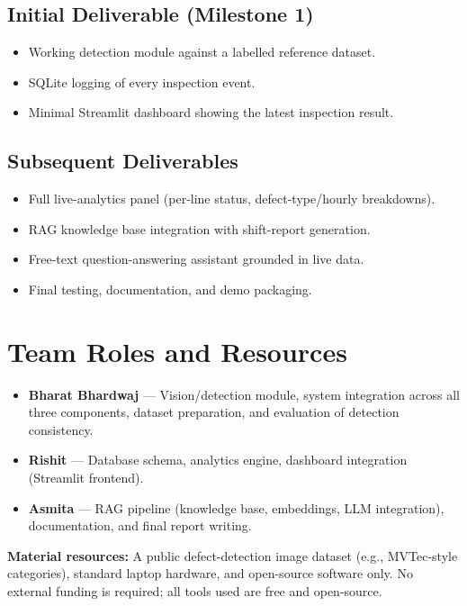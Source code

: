 \documentclass[11pt]{article}
\begin{document}
\subsection{Initial Deliverable (Milestone 1)}
\begin{itemize}[leftmargin=*]
    \item Working detection module against a labelled reference dataset.
    \item SQLite logging of every inspection event.
    \item Minimal Streamlit dashboard showing the latest inspection result.
\end{itemize}

\subsection{Subsequent Deliverables}
\begin{itemize}[leftmargin=*]
    \item Full live-analytics panel (per-line status, defect-type/hourly breakdowns).
    \item RAG knowledge base integration with shift-report generation.
    \item Free-text question-answering assistant grounded in live data.
    \item Final testing, documentation, and demo packaging.
\end{itemize}

\section{Team Roles and Resources}
\begin{itemize}[leftmargin=*]
    \item \textbf{Bharat Bhardwaj} --- Vision/detection module, system integration across all
    three components, dataset preparation, and evaluation of detection consistency.
    \item \textbf{Rishit} --- Database schema, analytics engine, dashboard integration
    (Streamlit frontend).
    \item \textbf{Asmita} --- RAG pipeline (knowledge base, embeddings, LLM integration),
    documentation, and final report writing.
\end{itemize}
\noindent\textbf{Material resources:} A public defect-detection image dataset (e.g., MVTec-style
categories), standard laptop hardware, and open-source software only. No external funding is
required; all tools used are free and open-source.
\end{document}
